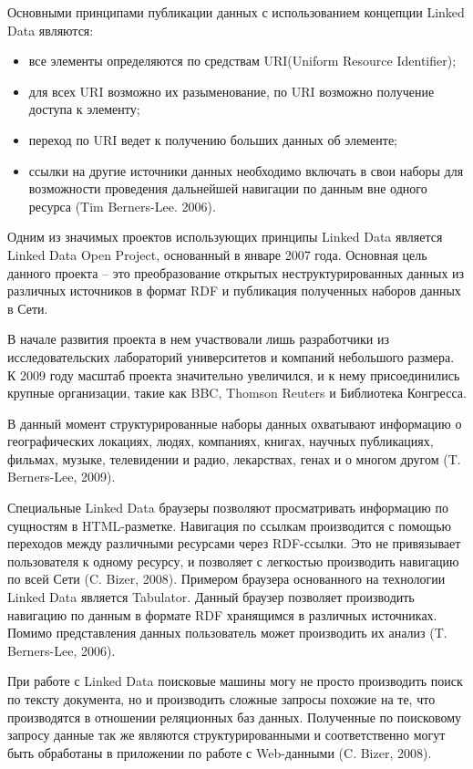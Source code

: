 Основными принципами публикации данных с использованием концепции Linked Data являются:

\begin{itemize}
\item все элементы определяются по средствам  URI(Uniform Resource Identifier);
\item для всех URI возможно их разыменование,  по URI возможно получение доступа к элементу;
\item переход по URI ведет к получению больших данных об элементе;
\item ссылки на другие источники данных необходимо включать в свои наборы для возможности проведения дальнейшей навигации по данным вне одного ресурса (Tim Berners-Lee. 2006). 
\end{itemize}

Одним из значимых проектов использующих принципы Linked Data является Linked Data Open Project, основанный в январе 2007 года. Основная цель данного проекта – это преобразование открытых неструктурированных данных из различных источников в формат RDF и публикация полученных наборов данных в Сети.

В начале развития проекта в нем участвовали лишь разработчики из исследовательских лабораторий университетов и компаний небольшого размера. К 2009 году масштаб проекта значительно увеличился, и к нему присоединились крупные организации, такие как BBC, Thomson Reuters и Библиотека Конгресса.

В данный момент структурированные наборы данных охватывают информацию о географических локациях, людях, компаниях, книгах, научных публикациях, фильмах, музыке, телевидении и радио, лекарствах, генах и о многом другом (T. Berners-Lee, 2009). 

Специальные Linked Data браузеры позволяют просматривать информацию по сущностям в HTML-разметке. Навигация по ссылкам производится с помощью переходов между различными ресурсами через RDF-ссылки. Это не привязывает пользователя к одному ресурсу, и позволяет с легкостью производить навигацию по всей Сети (C. Bizer, 2008). Примером браузера основанного на технологии Linked Data является Tabulator. Данный браузер позволяет производить навигацию по данным в формате RDF хранящимся в различных источниках. Помимо представления данных пользователь может производить их анализ (T. Berners-Lee, 2006).

При работе с Linked Data поисковые машины могу не просто производить поиск по тексту документа, но и производить сложные запросы похожие на те, что производятся в отношении реляционных баз данных. Полученные по поисковому запросу данные так же являются структурированными и соответственно могут быть обработаны в приложении по работе с Web-данными (C. Bizer, 2008).

